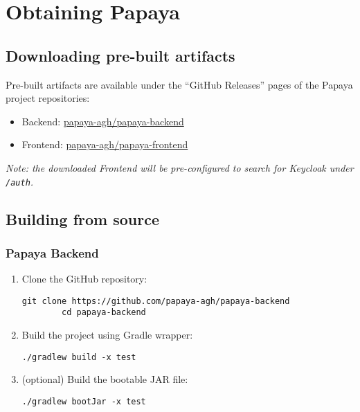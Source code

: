\section{Obtaining Papaya}\label{sec:obtaining-papaya}

\subsection{Downloading pre-built artifacts}\label{subsec:downloading-pre-built-artifacts}

Pre-built artifacts are available under the ``GitHub Releases'' pages of the
Papaya project repositories:
\begin{itemize}
    \item Backend:
    \href{https://github.com/papaya-agh/papaya-backend/releases}{papaya-agh/papaya-backend}

    \item Frontend:
    \href{https://github.com/papaya-agh/papaya-frontend/releases}{papaya-agh/papaya-frontend}
\end{itemize}

\emph{Note: the downloaded Frontend will be pre-configured to search for Keycloak under \texttt{/auth}.}

\subsection{Building from source}\label{subsec:building-from-source}

\subsubsection*{Papaya Backend}

\begin{enumerate}
    \item Clone the GitHub repository:
    \begin{lstlisting}[gobble=8]
        git clone https://github.com/papaya-agh/papaya-backend
        cd papaya-backend
    \end{lstlisting}

    \item Build the project using Gradle wrapper:
    \begin{lstlisting}[gobble=8]
        ./gradlew build -x test
    \end{lstlisting}

    \item (optional) Build the bootable JAR file:
    \begin{lstlisting}[gobble=8]
        ./gradlew bootJar -x test
    \end{lstlisting}
\end{enumerate}

